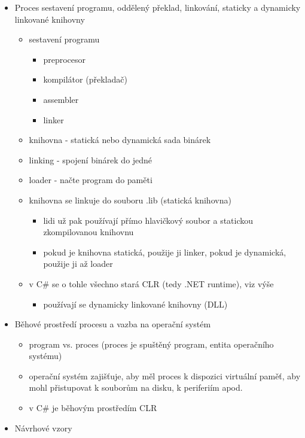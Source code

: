 \begin{itemize}
\begin{itemize}
\begin{itemize}
\begin{itemize}
\item některé věci tam nefungují
\end{itemize}
\end{itemize}
\end{itemize}
\item Proces sestavení programu, oddělený překlad, linkování, staticky a dynamicky linkované knihovny
\begin{itemize}
\item sestavení programu
\begin{itemize}
\item preprocesor
\item kompilátor (překladač)
\item assembler
\item linker
\end{itemize}
\item knihovna - statická nebo dynamická sada binárek
\item linking - spojení binárek do jedné
\item loader - načte program do paměti
\item knihovna se linkuje do souboru .lib (statická knihovna)
\begin{itemize}
\item lidi už pak používají přímo hlavičkový soubor a statickou zkompilovanou knihovnu
\item pokud je knihovna statická, použije ji linker, pokud je dynamická, použije ji až loader
\end{itemize}
\item v C\# se o tohle všechno stará CLR (tedy .NET runtime), viz výše
\begin{itemize}
\item používají se dynamicky linkované knihovny (DLL)
\end{itemize}
\end{itemize}
\item Běhové prostředí procesu a vazba na operační systém
\begin{itemize}
\item program vs. proces (proces je spuštěný program, entita operačního systému)
\item operační systém zajišťuje, aby měl proces k dispozici virtuální paměť, aby mohl přistupovat k souborům na disku, k periferiím apod.
\item v C\# je běhovým prostředím CLR
\end{itemize}
\item Návrhové vzory

\end{itemize}
